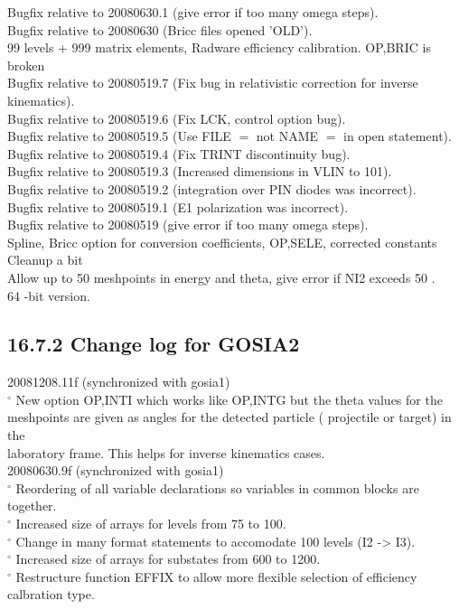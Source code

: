 \documentclass[10pt]{article}
\begin{document}
Bugfix relative to 20080630.1 (give error if too many omega steps).\\
Bugfix relative to 20080630 (Bricc files opened 'OLD').\\
99 levels + 999 matrix elements, Radware efficiency calibration. OP,BRIC is broken\\
Bugfix relative to 20080519.7 (Fix bug in relativistic correction for inverse kinematics).\\
Bugfix relative to 20080519.6 (Fix LCK, control option bug).\\
Bugfix relative to 20080519.5 (Use FILE $=$ not NAME $=$ in open statement).\\
Bugfix relative to 20080519.4 (Fix TRINT discontinuity bug).\\
Bugfix relative to 20080519.3 (Increased dimensions in VLIN to 101).\\
Bugfix relative to 20080519.2 (integration over PIN diodes was incorrect).\\
Bugfix relative to 20080519.1 (E1 polarization was incorrect).\\
Bugfix relative to 20080519 (give error if too many omega steps).\\
Spline, Bricc option for conversion coefficients, OP,SELE, corrected constants Cleanup a bit\\
Allow up to 50 meshpoints in energy and theta, give error if NI2 exceeds 50 .\\
64 -bit version.

\subsection*{16.7.2 Change log for GOSIA2}
20081208.11f (synchronized with gosia1)\\
${ }^{\circ}$ New option OP,INTI which works like OP,INTG but the theta values for the meshpoints are given as angles for the detected particle ( projectile or target) in the\\
laboratory frame. This helps for inverse kinematics cases.\\
20080630.9f (synchronized with gosia1)\\
${ }^{\circ}$ Reordering of all variable declarations so variables in common blocks are together.\\
${ }^{\circ}$ Increased size of arrays for levels from 75 to 100.\\
${ }^{\circ}$ Change in many format statements to accomodate 100 levels (I2 -> I3).\\
${ }^{\circ}$ Increased size of arrays for substates from 600 to 1200.\\
${ }^{\circ}$ Restructure function EFFIX to allow more flexible selection of efficiency calbration type.
\end{document}
